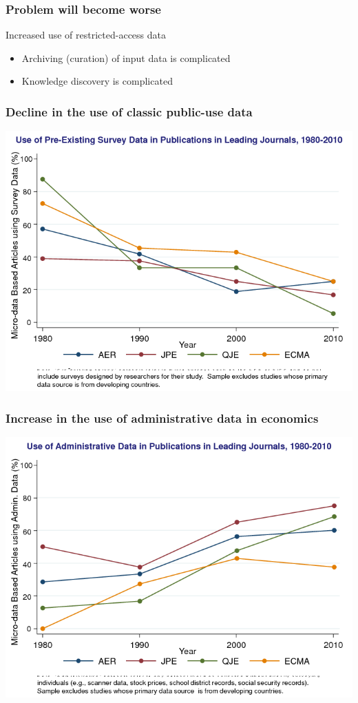 \begin{frame}
	\frametitle{Problem will become worse}
	\begin{block}{Increased use of restricted-access data}
		\begin{itemize}
			\item Archiving (curation) of input data is complicated
			\item Knowledge discovery is complicated
		\end{itemize}
	\end{block}
\end{frame}
\begin{frame}
	\frametitle{Decline in the use of classic public-use data}
	\centering
	\includegraphics[width=0.7\paperwidth]{ChettySlide1}
\end{frame}

\begin{frame}
	\frametitle{Increase in the use of administrative data in economics}
	\centering
	\includegraphics[width=0.7\paperwidth]{ChettySlide2}
\end{frame}


